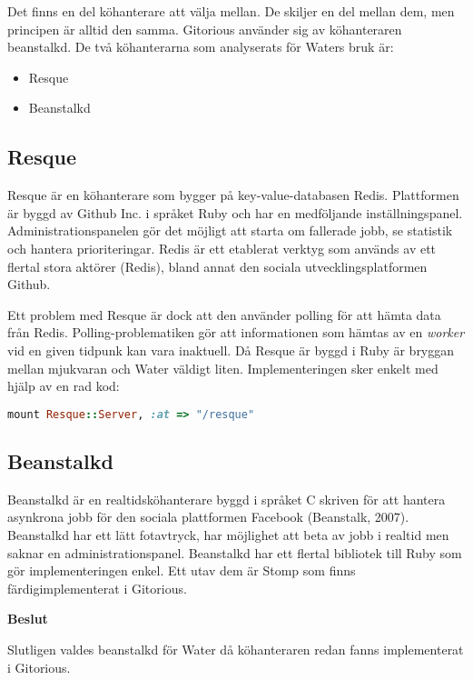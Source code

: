Det finns en del köhanterare att välja mellan. De skiljer en del mellan dem, men principen är alltid den samma. Gitorious använder sig  av köhanteraren beanstalkd.
De två köhanterarna som analyserats för Waters bruk är:

\begin{itemize}
  \item Resque
  \item Beanstalkd
\end{itemize}

\subsection{Resque}

Resque är en köhanterare som bygger på key-value-databasen Redis. Plattformen
är byggd av Github Inc. i språket Ruby och har en medföljande
inställningspanel. Administrationspanelen gör det möjligt att starta om
fallerade jobb, se statistik och hantera prioriteringar. Redis är ett etablerat
verktyg som används av ett flertal stora aktörer (Redis), bland annat den sociala utvecklingsplatformen Github.

Ett problem med Resque är dock att den använder polling för att hämta data från
Redis. Polling-problematiken gör att informationen som hämtas av en \emph{worker} vid
en given tidpunk kan vara inaktuell. Då Resque är byggd i Ruby är bryggan
mellan mjukvaran och Water väldigt liten. Implementeringen sker enkelt med
hjälp av en rad kod:

\begin{lstlisting}[language=Ruby]
  mount Resque::Server, :at => "/resque"
\end{lstlisting}

\subsection{Beanstalkd}
Beanstalkd är en realtidsköhanterare byggd i språket C skriven för att hantera asynkrona jobb för den sociala plattformen Facebook (Beanstalk, 2007). Beanstalkd har ett lätt fotavtryck, har möjlighet att beta av jobb i realtid men saknar en administrationspanel.
Beanstalkd har ett flertal bibliotek till Ruby som gör implementeringen enkel. Ett utav dem är Stomp som finns färdigimplementerat i Gitorious.

\begin{flushright}

  \textbf{Beslut}

  Slutligen valdes beanstalkd för Water då köhanteraren redan fanns implementerat i Gitorious.

\end{flushright}
